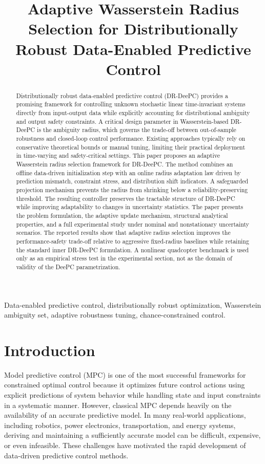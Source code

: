 \documentclass[conference]{IEEEtran}
\title{Adaptive Wasserstein Radius Selection for Distributionally Robust Data-Enabled Predictive Control}
\author{\IEEEauthorblockN{Anonymous Author(s)}}
\begin{document}
\maketitle

\begin{abstract}
Distributionally robust data-enabled predictive control (DR-DeePC) provides a promising framework for controlling unknown stochastic linear time-invariant systems directly from input-output data while explicitly accounting for distributional ambiguity and output safety constraints. A critical design parameter in Wasserstein-based DR-DeePC is the ambiguity radius, which governs the trade-off between out-of-sample robustness and closed-loop control performance. Existing approaches typically rely on conservative theoretical bounds or manual tuning, limiting their practical deployment in time-varying and safety-critical settings. This paper proposes an adaptive Wasserstein radius selection framework for DR-DeePC. The method combines an offline data-driven initialization step with an online radius adaptation law driven by prediction mismatch, constraint stress, and distribution shift indicators. A safeguarded projection mechanism prevents the radius from shrinking below a reliability-preserving threshold. The resulting controller preserves the tractable structure of DR-DeePC while improving adaptability to changes in uncertainty statistics. The paper presents the problem formulation, the adaptive update mechanism, structural analytical properties, and a full experimental study under nominal and nonstationary uncertainty scenarios. The reported results show that adaptive radius selection improves the performance-safety trade-off relative to aggressive fixed-radius baselines while retaining the standard inner DR-DeePC formulation. A nonlinear quadcopter benchmark is used only as an empirical stress test in the experimental section, not as the domain of validity of the DeePC parametrization.
\end{abstract}

\begin{IEEEkeywords}
Data-enabled predictive control, distributionally robust optimization, Wasserstein ambiguity set, adaptive robustness tuning, chance-constrained control.
\end{IEEEkeywords}

\section{Introduction}
Model predictive control (MPC) is one of the most successful frameworks for constrained optimal control because it optimizes future control actions using explicit predictions of system behavior while handling state and input constraints in a systematic manner. However, classical MPC depends heavily on the availability of an accurate predictive model. In many real-world applications, including robotics, power electronics, transportation, and energy systems, deriving and maintaining a sufficiently accurate model can be difficult, expensive, or even infeasible. These challenges have motivated the rapid development of data-driven predictive control methods.
\end{document}
